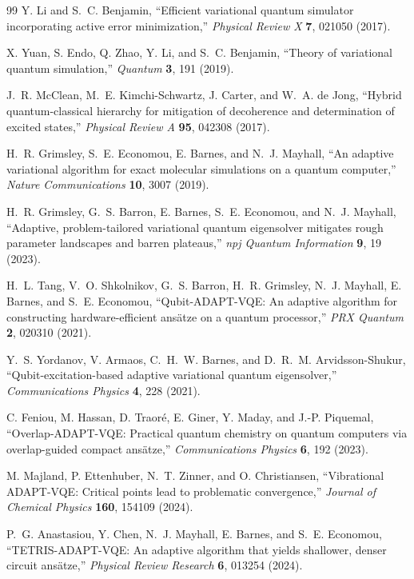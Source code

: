 \documentclass[
  reprint,
  amsmath,
  amssymb,
  aps,
  pra,
  nofootinbib,
  superscriptaddress,
  floatfix
]{revtex4-2}
\begin{document}
\begin{thebibliography}{99}
Y. Li and S.~C. Benjamin,
``Efficient variational quantum simulator incorporating active error minimization,''
\emph{Physical Review X} \textbf{7}, 021050 (2017).

X. Yuan, S. Endo, Q. Zhao, Y. Li, and S.~C. Benjamin,
``Theory of variational quantum simulation,''
\emph{Quantum} \textbf{3}, 191 (2019).

J.~R. McClean, M.~E. Kimchi-Schwartz, J. Carter, and W.~A. de Jong,
``Hybrid quantum-classical hierarchy for mitigation of decoherence and determination of excited states,''
\emph{Physical Review A} \textbf{95}, 042308 (2017).

H.~R. Grimsley, S.~E. Economou, E. Barnes, and N.~J. Mayhall,
``An adaptive variational algorithm for exact molecular simulations on a quantum computer,''
\emph{Nature Communications} \textbf{10}, 3007 (2019).

H.~R. Grimsley, G.~S. Barron, E. Barnes, S.~E. Economou, and N.~J. Mayhall,
``Adaptive, problem-tailored variational quantum eigensolver mitigates rough parameter landscapes and barren plateaus,''
\emph{npj Quantum Information} \textbf{9}, 19 (2023).

H.~L. Tang, V.~O. Shkolnikov, G.~S. Barron, H.~R. Grimsley, N.~J. Mayhall, E. Barnes, and S.~E. Economou,
``Qubit-ADAPT-VQE: An adaptive algorithm for constructing hardware-efficient ans\"atze on a quantum processor,''
\emph{PRX Quantum} \textbf{2}, 020310 (2021).

Y.~S. Yordanov, V. Armaos, C.~H.~W. Barnes, and D.~R.~M. Arvidsson-Shukur,
``Qubit-excitation-based adaptive variational quantum eigensolver,''
\emph{Communications Physics} \textbf{4}, 228 (2021).

C. Feniou, M. Hassan, D. Traor\'e, E. Giner, Y. Maday, and J.-P. Piquemal,
``Overlap-ADAPT-VQE: Practical quantum chemistry on quantum computers via overlap-guided compact ans\"atze,''
\emph{Communications Physics} \textbf{6}, 192 (2023).

M. Majland, P. Ettenhuber, N.~T. Zinner, and O. Christiansen,
``Vibrational ADAPT-VQE: Critical points lead to problematic convergence,''
\emph{Journal of Chemical Physics} \textbf{160}, 154109 (2024).

P.~G. Anastasiou, Y. Chen, N.~J. Mayhall, E. Barnes, and S.~E. Economou,
``TETRIS-ADAPT-VQE: An adaptive algorithm that yields shallower, denser circuit ans\"atze,''
\emph{Physical Review Research} \textbf{6}, 013254 (2024).


\end{thebibliography}
\end{document}
